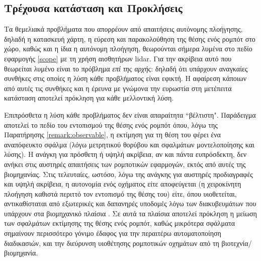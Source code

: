 \subsection{Τρέχουσα κατάσταση και Προκλήσεις}
\label{subsec:01_01_01_3}

Τα θεμελιακά προβλήματα που απορρέουν από απαιτήσεις αυτόνομης πλοήγησης,
δηλαδή η κατασκευή χάρτη, η εύρεση και παρακολούθηση της θέσης ενός ρομπότ στο
χώρο, καθώς και η ίδια η αυτόνομη πλοήγηση, θεωρούνται σήμερα λυμένα στο πεδίο
εφαρμογής \ref{scope} με τη χρήση αισθητήρων lidar. Για την ακρίβεια αυτό που
θεωρείται λυμένο είναι το πρόβλημα \textit{επί της αρχής}: δηλαδή ότι υπάρχουν
αναγκαίες συνθήκες στις οποίες η λύση κάθε προβλήματος είναι εφικτή. Η αφαίρεση
κάποιων από αυτές τις συνθήκες και η έρευνα με γνώμονα την ευρωστία στη
μετέπειτα κατάσταση αποτελεί πρόκληση για κάθε μελλοντική λύση.

Επιπρόσθετα η λύση κάθε προβλήματος δεν είναι απαραίτητα ``βέλτιστη".
Παράδειγμα αποτελεί το πεδίο του εντοπισμού της θέσης ενός ρομπότ όπου, λόγω
της Παρατήρησης \ref{remark:observable}, η εκτίμηση για τη θέση του φέρει ένα
αναπόφευκτο σφάλμα (λόγω μετρητικού θορύβου και σφαλμάτων μοντελοποίησης και
λύσης).  H ανάγκη για πρόσθετη ή υψηλή ακρίβεια, αν και πάντα ευπρόσδεκτη, δεν
ανήκει στις αυστηρές απαιτήσεις των ρομποτικών εφαρμογών, εκτός από αυτές της
βιομηχανίας.  Στις τελευταίες, ωστόσο, λόγω της ανάγκης για αυστηρές
προδιαγραφές και υψηλή ακρίβεια, η αυτονομία ενός οχήματος είτε αποφεύγεται
(η χειροκίνητη πλοήγηση καθιστά περιττό τον εντοπισμό της θέσης του) είτε,
όπου υιοθετείται, αντικαθίσταται από εξωτερικές και δαπανηρές υποδομές λόγω των
διακυβευμάτων που υπάρχουν στα βιομηχανικό πλαίσια \cite{Vasiljevic2016a}. Σε
αυτά τα πλαίσια αποτελεί πρόκληση η μείωση των σφαλμάτων εκτίμησης της θέσης
ενός ρομπότ, καθώς μικρότερα σφάλματα σημαίνουν περισσότερο γόνιμο έδαφος για
την περαιτέρω αυτοματοποίηση διαδικασιών, και την διεύρυνση υιοθέτησης
ρομποτικών οχημάτων από τη βιοτεχνία/βιομηχανία.
